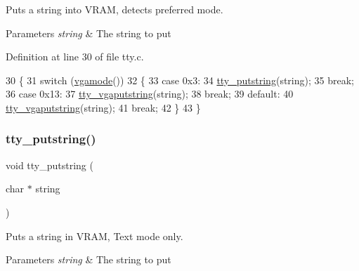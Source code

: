 Puts a string into V\+R\+AM, detects preferred mode. 


\begin{DoxyParams}{Parameters}
{\em string} & The string to put \\
\hline
\end{DoxyParams}


Definition at line 30 of file tty.\+c.


\begin{DoxyCode}
30                                   \{
31     \textcolor{keywordflow}{switch} (\hyperlink{a00026_af6d170c9401ea8f94d4c5cf09347cca7_af6d170c9401ea8f94d4c5cf09347cca7}{vgamode}())
32     \{
33     \textcolor{keywordflow}{case} 0x3:
34         \hyperlink{a00113_a2ebb962f457a2677d70285d1c0f9be12_a2ebb962f457a2677d70285d1c0f9be12}{tty\_putstring}(\textcolor{keywordtype}{string});
35         \textcolor{keywordflow}{break};
36     \textcolor{keywordflow}{case} 0x13:
37         \hyperlink{a00113_a13ff2c06d56753c5666ca56cb2d81100_a13ff2c06d56753c5666ca56cb2d81100}{tty\_vgaputstring}(\textcolor{keywordtype}{string});
38         \textcolor{keywordflow}{break};
39     \textcolor{keywordflow}{default}:
40         \hyperlink{a00113_a13ff2c06d56753c5666ca56cb2d81100_a13ff2c06d56753c5666ca56cb2d81100}{tty\_vgaputstring}(\textcolor{keywordtype}{string});
41         \textcolor{keywordflow}{break};
42     \}
43 \}
\end{DoxyCode}
\mbox{\label{a00116_a2ebb962f457a2677d70285d1c0f9be12_a2ebb962f457a2677d70285d1c0f9be12}} 
\subsubsection{\texorpdfstring{tty\+\_\+putstring()}{tty\_putstring()}}
{\footnotesize\ttfamily void tty\+\_\+putstring (\begin{DoxyParamCaption}\item[{char $\ast$}]{string }\end{DoxyParamCaption})}



Puts a string in V\+R\+AM, Text mode only. 


\begin{DoxyParams}{Parameters}
{\em string} & The string to put \\
\hline
\end{DoxyParams}


